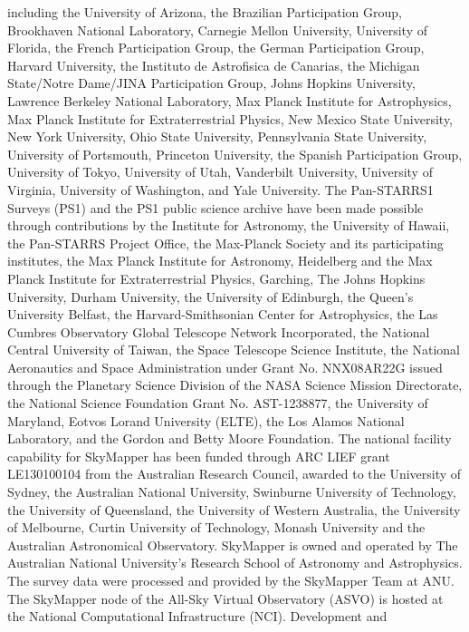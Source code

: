 \documentclass{aa}
\begin{document}
\begin{acknowledgements}
including the University of Arizona, the Brazilian Participation Group,
Brookhaven National Laboratory, Carnegie Mellon University, University of
Florida, the French Participation Group, the German Participation Group, Harvard
University, the Instituto de Astrofisica de Canarias, the Michigan State/Notre
Dame/JINA Participation Group, Johns Hopkins University, Lawrence Berkeley
National Laboratory, Max Planck Institute for Astrophysics, Max Planck Institute
for Extraterrestrial Physics, New Mexico State University, New York University,
Ohio State University, Pennsylvania State University, University of Portsmouth,
Princeton University, the Spanish Participation Group, University of Tokyo,
University of Utah, Vanderbilt University, University of Virginia, University of
Washington, and Yale University.
The Pan-STARRS1 Surveys (PS1) and the PS1 public science archive
\citep{flewelling2020} have been made possible through contributions by the
Institute for Astronomy, the University of Hawaii, the Pan-STARRS Project
Office, the Max-Planck Society and its participating institutes, the Max Planck
Institute for Astronomy, Heidelberg and the Max Planck Institute for
Extraterrestrial Physics, Garching, The Johns Hopkins University, Durham
University, the University of Edinburgh, the Queen's University Belfast, the
Harvard-Smithsonian Center for Astrophysics, the Las Cumbres Observatory Global
Telescope Network Incorporated, the National Central University of Taiwan, the
Space Telescope Science Institute, the National Aeronautics and Space
Administration under Grant No. NNX08AR22G issued through the Planetary Science
Division of the NASA Science Mission Directorate, the National Science
Foundation Grant No. AST-1238877, the University of Maryland, Eotvos Lorand
University (ELTE), the Los Alamos National Laboratory, and the Gordon and Betty
Moore Foundation.
The national facility capability for SkyMapper has been funded through ARC LIEF
grant LE130100104 from the Australian Research Council, awarded to the
University of Sydney, the Australian National University, Swinburne University
of Technology, the University of Queensland, the University of Western
Australia, the University of Melbourne, Curtin University of Technology, Monash
University and the Australian Astronomical Observatory. SkyMapper is owned and
operated by The Australian National University's Research School of Astronomy
and Astrophysics. The survey data were processed and provided by the SkyMapper
Team at ANU. The SkyMapper node of the All-Sky Virtual Observatory (ASVO) is
hosted at the National Computational Infrastructure (NCI). Development and

\end{acknowledgements}
\end{document}
